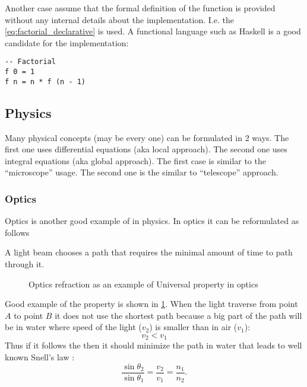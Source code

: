Another case assume that the formal definition of the function is
provided without any internal details about the implementation. 
I.e. the \eqref{eq:factorial_declarative} is used. A functional
language such as Haskell is a good candidate for the implementation:
\begin{verbatim}
-- Factorial
f 0 = 1
f n = n * f (n - 1)
\end{verbatim}

\subsection{Physics}
\label{sec:caapproach_physics}
Many physical concepts (may be every one) can be formulated in 2 ways.
The first one uses differential equations (aka local approach). The
second one uses integral equations (aka global approach). The first
case is similar to the ``microscope'' usage. The second one is the
similar to ``telescope'' approach.

\subsubsection{Optics}

Optics is another good example of  in
physics. In optics it can be reformulated as follows
\begin{remark}
\label{rem:universalpropertyoptics}
A light beam chooses a path that requires the minimal amount of time to
path through it.
\end{remark}

\begin{figure}
  \centering
  
  \caption{Optics refraction as an example of Universal property in optics}
  \label{fig:opticsrefraction}
\end{figure}

Good example of the property is shown in \cref{fig:opticsrefraction}.
When the light traverse from point $A$ to point $B$ it does not use
the shortest path because a big part of the path will be in water
where speed of the light ($v_2$) is smaller than in air ($v_1$):
\[
v_2 < v_1
\]
Thus if it follows
the  then it should minimize the path
in water that leads to well known Snell's law \cite{wiki:snellslaw}:
\[
\frac{\sin \theta_2}{\sin \theta_1} = \frac{v_2}{v_1} = \frac{n_1}{n_2}.
\]

